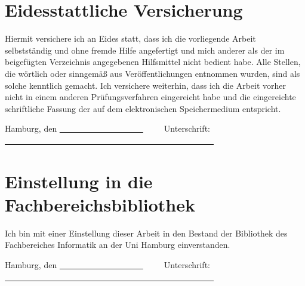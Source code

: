 
\chapter*{Eidesstattliche Versicherung}
Hiermit versichere ich an Eides statt, dass ich die vorliegende Arbeit selbstständig und ohne fremde Hilfe angefertigt und mich anderer als der im beigefügten Verzeichnis angegebenen Hilfsmittel nicht bedient habe.
Alle Stellen, die wörtlich oder sinngemäß aus Veröffentlichungen entnommen wurden, sind als solche kenntlich gemacht.
Ich versichere weiterhin, dass ich die Arbeit vorher nicht in einem anderen Prüfungsverfahren eingereicht habe und die eingereichte schriftliche Fassung der auf dem elektronischen Speichermedium entspricht.

\vspace{2cm}

\noindent Hamburg, den \uline{~~~~~~~~~~~~~~~~~~~~}~~~~~Unterschrift: \uline{~~~~~~~~~~~~~~~~~~~~~~~~~~~~~~~~~~~~~~~~~~~~~~~~~~}


\chapter*{Einstellung in die Fachbereichsbibliothek}
Ich bin mit einer Einstellung dieser Arbeit in den Bestand der Bibliothek des Fachbereiches Informatik an der Uni Hamburg einverstanden.

\vspace{2cm}

\noindent Hamburg, den \uline{~~~~~~~~~~~~~~~~~~~~}~~~~~Unterschrift: \uline{~~~~~~~~~~~~~~~~~~~~~~~~~~~~~~~~~~~~~~~~~~~~~~~~~~}
